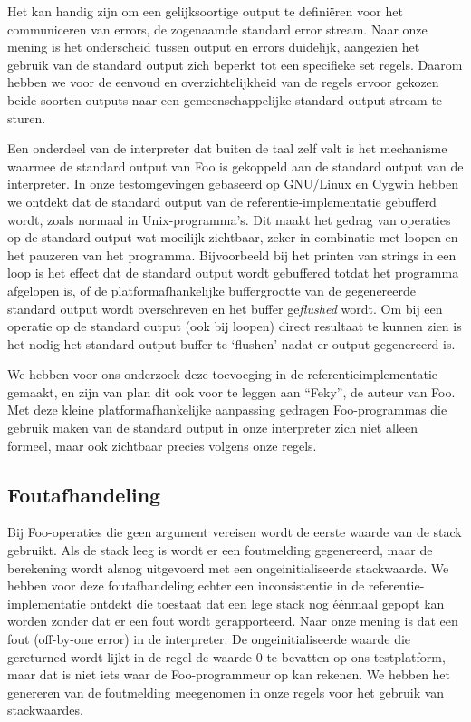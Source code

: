 \documentclass[11pt]{article}
\begin{document}
Het kan handig zijn om een gelijksoortige output te defini\"eren voor het communiceren van errors, de zogenaamde standard error stream.
Naar onze mening is het onderscheid tussen output en errors duidelijk, aangezien het gebruik van de standard output zich beperkt tot een specifieke set regels.
Daarom hebben we voor de eenvoud en overzichtelijkheid van de regels ervoor gekozen beide soorten outputs naar een gemeenschappelijke standard output stream te sturen.

Een onderdeel van de interpreter dat buiten de taal zelf valt is het mechanisme waarmee de standard output van Foo is gekoppeld aan de standard output van de interpreter.
In onze testomgevingen gebaseerd op GNU/Linux en Cygwin hebben we ontdekt dat de standard output van de referentie-implementatie gebufferd wordt, zoals normaal in Unix-programma's.
Dit maakt het gedrag van operaties op de standard output wat moeilijk zichtbaar, zeker in combinatie met loopen en het pauzeren van het programma.
Bijvoorbeeld bij het printen van strings in een loop is het effect dat de standard output wordt gebuffered totdat het programma afgelopen is, of de platformafhankelijke buffergrootte van de gegenereerde standard output wordt overschreven en het buffer ge\textit{flushed} wordt.
Om bij een operatie op de standard output (ook bij loopen) direct resultaat te kunnen zien is het nodig het standard output buffer te `flushen' nadat er output gegenereerd is.

We hebben voor ons onderzoek deze toevoeging in de referentieimplementatie gemaakt, en zijn van plan dit ook voor te leggen aan ``Feky'', de auteur van Foo.
Met deze kleine platformafhankelijke aanpassing gedragen Foo-programmas die gebruik maken van de standard output in onze interpreter zich niet alleen formeel, maar ook zichtbaar precies volgens onze regels.


\subsection{Foutafhandeling} 
Bij Foo-operaties die geen argument vereisen wordt de eerste waarde van de stack gebruikt. 
Als de stack leeg is wordt er een foutmelding gegenereerd, maar de berekening wordt alsnog uitgevoerd met een ongeinitialiseerde stackwaarde.
We hebben voor deze foutafhandeling echter een inconsistentie in de referentie-implementatie ontdekt die toestaat dat een lege stack nog \'e\'enmaal gepopt kan worden zonder dat er een fout wordt gerapporteerd.
Naar onze mening is dat een fout (off-by-one error) in de interpreter.
De ongeinitialiseerde waarde die gereturned wordt lijkt in de regel de waarde 0 te bevatten op ons testplatform, maar dat is niet iets waar de Foo-programmeur op kan rekenen.
We hebben het genereren van de foutmelding meegenomen in onze regels voor het gebruik van stackwaardes.
\end{document}
